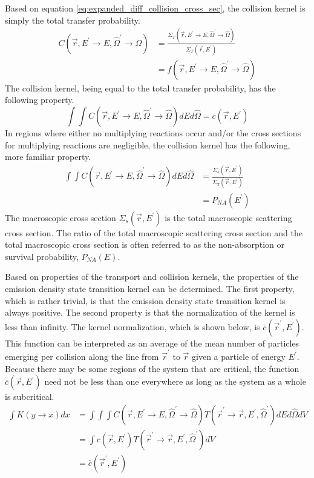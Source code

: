 Based on equation \ref{eq:expanded_diff_collision_cross_sec}, the collision 
kernel is simply the total transfer probability.  
\begin{align}
  C(\vec{r},E^{'} \to E, \hat{\Omega}^{'} \to \hat{\Omega}) & =
  \frac{\Sigma_T(\vec{r},E^{'} \to E,\hat{\Omega}^{'} \to \hat{\Omega})}
       {\Sigma_T(\vec{r},E^{'})} \nonumber \\
  & = f(\vec{r},E^{'} \to E,\hat{\Omega}^{'} \to \hat{\Omega})
\end{align}
The collision kernel, being equal to the total transfer probability, has the 
following property. 
\begin{equation}
  \int\int C(\vec{r},E^{'} \to E,\hat{\Omega}^{'} \to \hat{\Omega}) 
  dEd\hat{\Omega} = c(\vec{r},E^{'})
  \label{eq:collision_op_prop_gen}
\end{equation}
In regions where either no multiplying reactions occur and/or the cross sections
for multiplying reactions are negligible, the collision kernel has the 
following, more familiar property.
\begin{align}
  \int\int C(\vec{r},E^{'} \to E,\hat{\Omega}^{'} \to \hat{\Omega}) 
  dEd\hat{\Omega} & = \frac{\Sigma_s(\vec{r},E^{'})}{\Sigma_T(\vec{r},E^{'})}
  \label{eq:collision_op_prop} \\
  & = P_{NA}(E^{'}) \nonumber 
\end{align}
The macroscopic cross section $\Sigma_s(\vec{r},E^{'})$ is the total macroscopic
scattering cross section. The ratio of the total macroscopic scattering cross
section and the total macroscopic cross section is often referred to as the 
non-absorption or survival probability, $P_{NA}(E)$. 

Based on properties of the transport and collision kernels, the properties of 
the emission density state transition kernel can be determined. The first
property, which is rather trivial, is that the emission density state 
transition kernel is always positive. The second property is that the 
normalization of the kernel is less than infinity. The kernel normalization, 
which is shown below, is $\bar{c}(\vec{r}^{'},E^{'})$. This function can be 
interpreted as an average of the mean number of particles emerging per 
collision along the line from $\vec{r}^{'}$ to $\vec{r}$ given a particle of 
energy $E^{'}$. Because there may be some regions of the system that are 
critical, the function $\bar{c}(\vec{r},E^{'})$ need not be less than one 
everywhere as long as the system as a whole is subcritical.
\begin{align}
  \int K(y \to x) dx & = \int\int\int 
  C(\vec{r},E^{'} \to E,\hat{\Omega}^{'} \to \hat{\Omega})
  T(\vec{r}^{'} \to \vec{r},E^{'},\hat{\Omega}^{'}) dE d\hat{\Omega} dV 
  \nonumber \\
  & = \int c(\vec{r},E^{'}) T(\vec{r}^{'} \to \vec{r},E^{'},\hat{\Omega}^{'})
  dV \nonumber \\
  & = \bar{c}(\vec{r}^{'},E^{'})
\end{align}

